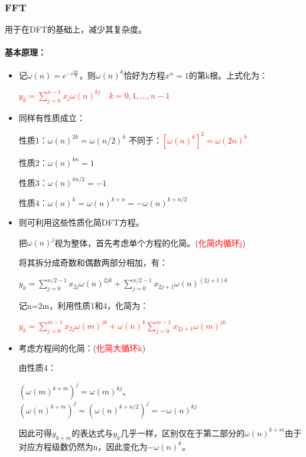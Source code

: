 \documentclass[UTF8]{article}%
\begin{document}
\subsubsection{FFT}

用于在DFT的基础上，减少其复杂度。

\paragraph{基本原理：}

\begin{itemize}
    \item 记$\omega (n)=e^{- i \frac{2 \pi }{n}}$，则$\omega (n)^k$恰好为方程$x^n=1$的第k根。上式化为：
    
    \textcolor{red}{$y_k=\sum_{j=0}^{n-1} x_j \omega (n)^{kj}\quad k=0,1,...,n-1$}

    \item 同样有性质成立：
    
    性质1：$\omega (n)^{2k}=\omega (n/2)^k$ 不同于：\textcolor{red}{$[\omega (n)^{k}]^2=\omega (2n)^k$}

    性质2：$\omega (n)^{kn}=1$

    性质3：$\omega (n)^{kn/2}=-1$
    
    性质4：$\omega (n)^{k}=\omega (n)^{k+n}=-\omega (n)^{k+n/2}$

    \item 则可利用这些性质化简DFT方程。
    
    把$\omega (n)^{j}$视为整体，首先考虑单个方程的化简。(\textcolor{red}{化简内循环j})
    
    将其拆分成奇数和偶数两部分相加，有：

    $y_{k}=\sum_{j=0}^{n/2-1} x_{2j} \omega(n)^{2jk}+\sum_{j=0}^{n/2-1} x_{2j+1} \omega(n)^{(2j+1)k}$

    记n=2m，利用性质1和4，化简为：

    \textcolor{red}{$y_{k}=\sum_{j=0}^{m-1} x_{2j} \omega(m)^{jk}+\omega(n)^{k}\sum_{j=0}^{m-1} x_{2j+1} \omega(m)^{jk}$}
    
    \item 考虑方程间的化简：(\textcolor{red}{化简大循环k})
    
    由性质4：
    
    $(\omega (m)^{k+m})^j=\omega (m)^{kj}$、$(\omega (n)^{k+m})^j=(\omega (n)^{k+n/2})^j=-\omega (n)^{kj}$

    因此可得$y_{k+m}$的表达式与$y_k$几乎一样，区别仅在于第二部分的$\omega(n)^{k+m}$由于对应方程级数仍然为n，因此变化为$-\omega(n)^{k}$。
    

\end{itemize}
\end{document}
